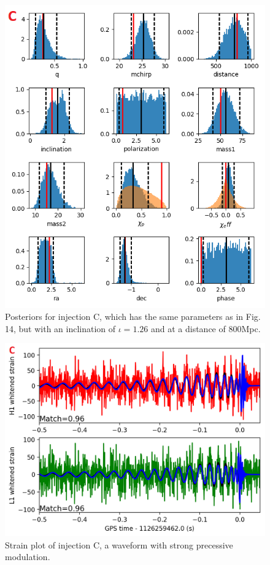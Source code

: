 \documentclass[11pt]{article}
\begin{document}
\begin{figure}[h]
	\includegraphics[width=1\textwidth]{fig17.png}
	\centering
	\caption{Posteriors for injection C, which has the same parameters as in Fig. 14, but with an inclination of $\iota=1.26$ and at a distance of 800Mpc.}
	\centering
\end{figure}
\begin{figure}[h]
	\includegraphics[scale=0.3]{fig18.png}
	\centering
	\caption{Strain plot of injection C, a waveform with strong precessive modulation.}
	\centering
\end{figure}
\end{document}
